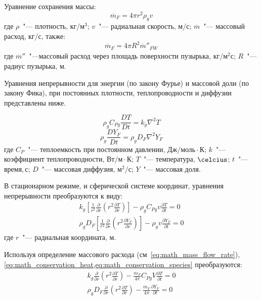 Уравнение сохранения массы:
\begin{equation}
{\stackrel{.}{m}}_{F}=4\pi {r}^{2}{\rho }_{g}v\label{eq:math_mass_flow_rate}
\end{equation}
где \(\rho\)~"--- плотность, \(\text{кг}/\text{м}^{3}\); \(v\)~"--- радиальная скорость, \(\text{м}/\text{с}\); \({\stackrel{.}{m}}\)~"--- массовый
расход, \(\text{кг}/\text{с}\), также:
\begin{equation}
{\stackrel{.}{m}}_{F}=4\pi {R}^{2}{{\stackrel{.}{m}}''_{FW} }_{}\label{eq:math_mass_flow_rate_surface}
\end{equation}
где \({\stackrel{.}{m}}''\)~"---массовый расход через площадь поверхности пузырька, \(\text{кг}/\text{м}^{2}\text{с}\); \(R\)~"---радиус пузырька,
м.  


Уравнения непрерывности для энергии (по закону Фурье) и массовой доли (по закону Фика), при постоянных плотности, теплопроводности и диффузии представлены ниже.

\begin{equation}
 {\rho }_{g}{C}_{Pg}\frac{DT}{Dt}={k}_{g}{\nabla }^{2}T 
\end{equation}
\begin{equation}
 {\rho }_{g}\frac{DY_{F}}{Dt}={\rho}_{g}D_{F}{\nabla }^{2}Y_{F} 
\end{equation}
где \({C}_{P}\)~"---  теплоемкость при постоянном давлении, \(\text{Дж}/\text{моль}\cdot\text{К}\); \(k\)~"--- коэффициент теплопроводности, \(\text{Вт}/\text{м}\cdot\text{К}\); \(T\)~"---
температура, \(\celcius\); \(t\)~"--- время,\,с; \(D\)~"--- массовая диффузия, \(\text{м}^{2}/\text{с}\); \(Y\)~"--- массовая доля.

В стационарном режиме, и сферической системе координат, уравнения непрерывности преобразуются к виду:
\begin{gather}
 {k}_{g}\left[\frac{1}{{r}^{2}}\frac{\partial }{\partial r}\left({r}^{2}\frac{\partial T}{\partial r}\right)\right]-{\rho }_{g}{C}_{Pg}v\frac{\partial T}{\partial
t}=0\label{eq:math_conservation_heat}\\
 {\rho}_{g}D_{F}\left[\frac{1}{{r}^{2}}\frac{\partial }{\partial r}\left({r}^{2}\frac{\partial Y_{F}}{\partial r}\right)\right]-{\rho }_{g}v\frac{\partial Y_{F}}{\partial
t}=0\label{eq:math_conservation_species}
\end{gather}
где \(r\)~"--- радиальная координата, \(\text{м}\). 

Используя определение массового расхода (см~\cref{eq:math_mass_flow_rate}), \cref{eq:math_conservation_heat,eq:math_conservation_species} преобразуются:
\begin{gather}
 {k}_{g}\frac{\partial }{\partial r}\left({r}^{2}\frac{\partial T}{\partial r}\right)-\frac{{\stackrel{.}{m}}_{F}}{4\pi}{C}_{Pg}V\frac{\partial T}{\partial
t}=0\label{eq:math_energy_diff}\\
 {\rho}_{g}D_{F}\frac{\partial }{\partial r}\left({r}^{2}\frac{\partial T}{\partial r}\right)-\frac{{\stackrel{.}{m}}_{F}}{4\pi}\frac{\partial Y_{F}}{\partial
t}=0\label{eq:math_species_diff}
\end{gather}

